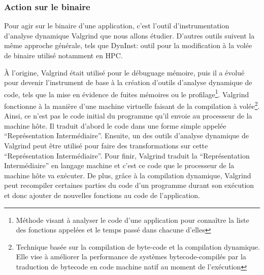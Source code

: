 \subsubsection{Action sur le binaire}

Pour agir sur le binaire d'une application, c'est l'outil d'instrumentation
d'analyse dynamique Valgrind \citep{Valgrind, Valgrindweb} que nous allons
étudier. D'autres outils suivent la même approche générale, tels que DynInst:
outil pour la modification à la volée de binaire utilisé notamment en HPC.

À l'origine, Valgrind était utilisé pour le débuguage mémoire, puis il a évolué
pour devenir l'instrument de base à la création d'outils d'analyse dynamique de
code, tels que la mise en évidence de fuites mémoires ou le
profilage\footnote{Méthode visant à analyser le code d'une application pour
connaître la liste des fonctions appelées et le temps passé dans chacune
d'elles}. Valgrind fonctionne à la manière d'une machine virtuelle faisant de la
compilation à volée\footnote{Technique basée sur la compilation de byte-code et
la compilation dynamique. Elle vise à améliorer la performance de systèmes
bytecode-compilés par la traduction de bytecode en code machine natif au moment
de l'exécution}. Ainsi, ce n'est pas le code initial du programme qu'il envoie
au processeur de la machine hôte. Il traduit d'abord le code dans une forme
simple appelée ``Représentation Intermédiaire''. Ensuite, un des outils
d'analyse dynamique de Valgrind peut être utilisé pour faire des transformations
sur cette ``Représentation Intermédiaire''. Pour finir, Valgrind traduit la
``Représentation Intermédiaire'' en langage machine et c'est ce code que le
processeur de la machine hôte va exécuter. De plus, grâce à la compilation
dynamique, Valgrind peut recompiler certaines parties du code d'un programme
durant son exécution et donc ajouter de nouvelles fonctions au code de
l'application.


